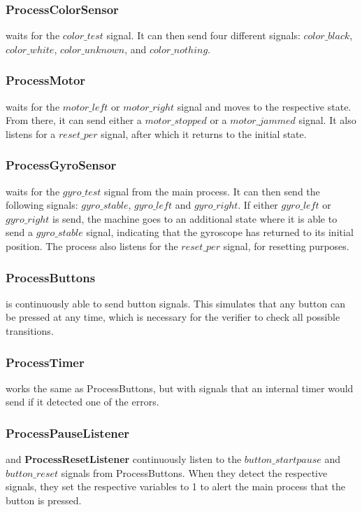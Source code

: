 \documentclass[a4paper,oneside,11pt]{article}
\begin{document}
\subsubsection{ProcessColorSensor} waits for the $color\_test$ signal. It can then send four different signals: $color\_black$, $color\_white$, $color\_unknown$, and $color\_nothing$.

\subsubsection{ProcessMotor} waits for the $motor\_left$ or $motor\_right$ signal and moves to the respective state. From there, it can send either a $motor\_stopped$ or a $motor\_jammed$ signal. It also listens for a $reset\_per$ signal, after which it returns to the initial state.

\subsubsection{ProcessGyroSensor} waits for the $gyro\_test$ signal from the main process. It can then send the following signals: $gyro\_stable$, $gyro\_left$ and $gyro\_right$. If either $gyro\_left$ or $gyro\_right$ is send, the machine goes to an additional state where it is able to send a $gyro\_stable$ signal, indicating that the gyroscope has returned to its initial position. The process also listens for the $reset\_per$ signal, for resetting purposes.

\subsubsection{ProcessButtons} is continuously able to send button signals. This simulates that any button can be pressed at any time, which is necessary for the verifier to check all possible transitions. 

\subsubsection{ProcessTimer} works the same as ProcessButtons, but with signals that an internal timer would send if it detected one of the errors.

\subsubsection{ProcessPauseListener} and \textbf{ProcessResetListener} continuously listen to the $button\_startpause$ and $button\_reset$ signals from ProcessButtons. When they detect the respective signals, they set the respective variables to 1 to alert the main process that the button is pressed.
\end{document}
